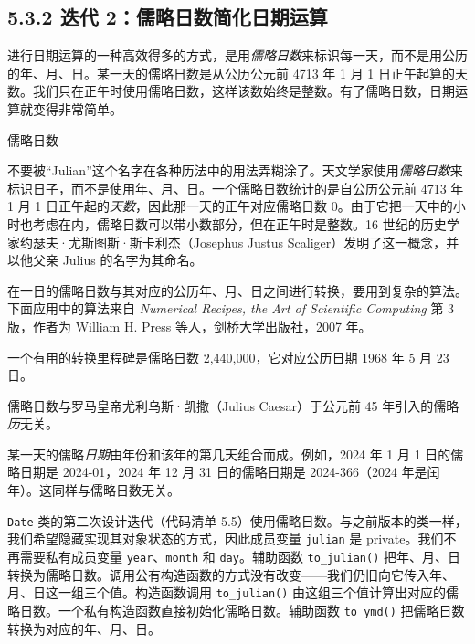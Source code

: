 
\subsection{5.3.2 迭代 2：儒略日数简化日期运算}

进行日期运算的一种高效得多的方式，是用\emph{儒略日数}来标识每一天，而不是用公历的年、月、日。某一天的儒略日数是从公历公元前 4713 年 1 月 1 日正午起算的天数。我们只在正午时使用儒略日数，这样该数始终是整数。有了儒略日数，日期运算就变得非常简单。

\begin{mySidebar}{儒略日数}

不要被“Julian”这个名字在各种历法中的用法弄糊涂了。天文学家使用\emph{儒略日数}来标识日子，而不是使用年、月、日。一个儒略日数统计的是自公历公元前 4713 年 1 月 1 日正午起的\emph{天数}，因此那一天的正午对应儒略日数 0。由于它把一天中的小时也考虑在内，儒略日数可以带小数部分，但在正午时是整数。16 世纪的历史学家约瑟夫·尤斯图斯·斯卡利杰（Josephus Justus Scaliger）发明了这一概念，并以他父亲 Julius 的名字为其命名。

在一日的儒略日数与其对应的公历年、月、日之间进行转换，要用到复杂的算法。下面应用中的算法来自 \emph{Numerical Recipes, the Art of Scientific Computing} 第 3 版，作者为 William H. Press 等人，剑桥大学出版社，2007 年。

一个有用的转换里程碑是儒略日数 2,440,000，它对应公历日期 1968 年 5 月 23 日。

儒略日数与罗马皇帝尤利乌斯·凯撒（Julius Caesar）于公元前 45 年引入的儒略\emph{历}无关。

某一天的儒略\emph{日期}由年份和该年的第几天组合而成。例如，2024 年 1 月 1 日的儒略日期是 2024-01，2024 年 12 月 31 日的儒略日期是 2024-366（2024 年是闰年）。这同样与儒略日数无关。
\end{mySidebar}

\texttt{Date} 类的第二次设计迭代（代码清单 5.5）使用儒略日数。与之前版本的类一样，我们希望隐藏实现其对象状态的方式，因此成员变量 \texttt{julian} 是 private。我们不再需要私有成员变量 \texttt{year}、\texttt{month} 和 \texttt{day}。辅助函数 \texttt{to\_\allowbreak{}julian(\allowbreak{})\allowbreak{}} 把年、月、日转换为儒略日数。调用公有构造函数的方式没有改变——我们仍旧向它传入年、月、日这一组三个值。构造函数调用 \texttt{to\_\allowbreak{}julian(\allowbreak{})\allowbreak{}} 由这组三个值计算出对应的儒略日数。一个私有构造函数直接初始化儒略日数。辅助函数 \texttt{to\_ymd()} 把儒略日数转换为对应的年、月、日。

